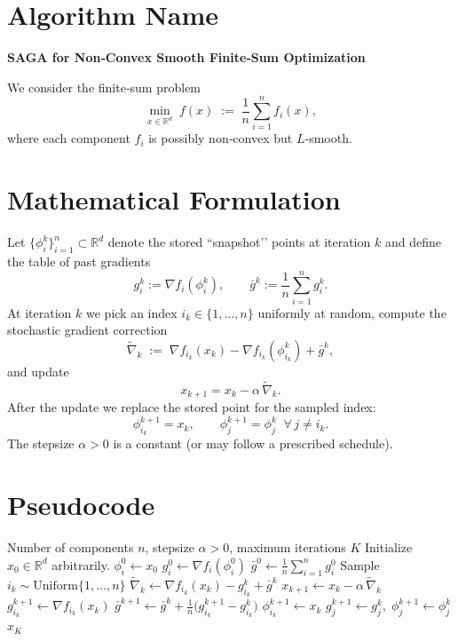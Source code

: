 \documentclass{article}
\newcommand{\R}{\mathbb{R}}
\begin{document}
\section*{Algorithm Name}
\textbf{SAGA for Non‑Convex Smooth Finite‑Sum Optimization}  

We consider the finite‑sum problem  
\[
\min_{x\in\R^{d}} \; f(x)\;:=\;\frac{1}{n}\sum_{i=1}^{n} f_i(x),
\]
where each component $f_i$ is possibly non‑convex but $L$‑smooth.

\section*{Mathematical Formulation}
Let $\{\phi_i^{k}\}_{i=1}^{n}\subset\R^{d}$ denote the stored “snapshot’’ points at iteration $k$
and define the table of past gradients
\[
g_i^{k}:=\nabla f_i(\phi_i^{k}),\qquad 
\bar g^{k}:=\frac{1}{n}\sum_{i=1}^{n} g_i^{k}.
\]
At iteration $k$ we pick an index $i_k\in\{1,\dots,n\}$ uniformly at random,
compute the stochastic gradient correction
\[
\widetilde{\nabla}_k \;:=\; \nabla f_{i_k}(x_k)-\nabla f_{i_k}(\phi_{i_k}^{k})+\bar g^{k},
\]
and update
\[
x_{k+1}=x_{k}-\alpha\,\widetilde{\nabla}_k . \tag{1}
\]
After the update we replace the stored point for the sampled index:
\[
\phi_{i_k}^{k+1}=x_k,\qquad 
\phi_{j}^{k+1}=\phi_{j}^{k}\;\; \forall\,j\neq i_k . \tag{2}
\]
The stepsize $\alpha>0$ is a constant (or may follow a prescribed schedule).

\section*{Pseudocode}
\begin{algorithm}[H]
\caption{SAGA (non‑convex)}\label{alg:saga}
\begin{algorithmic}[1]
\Require Number of components $n$, stepsize $\alpha>0$, maximum iterations $K$
\State Initialize $x_0\in\R^{d}$ arbitrarily.
    \State $\phi_i^{0}\gets x_0$   
    \State $g_i^{0}\gets\nabla f_i(\phi_i^{0})$
\EndFor
\State $\bar g^{0}\gets \frac{1}{n}\sum_{i=1}^{n} g_i^{0}$
    \State Sample $i_k\sim\text{Uniform}\{1,\dots,n\}$
    \State $\widetilde{\nabla}_k\gets \nabla f_{i_k}(x_k)-g_{i_k}^{k}+\bar g^{k}$
    \State $x_{k+1}\gets x_k-\alpha\,\widetilde{\nabla}_k$ 
    \State $g_{i_k}^{k+1}\gets \nabla f_{i_k}(x_k)$
    \State $\bar g^{k+1}\gets \bar g^{k}+ \frac{1}{n}\bigl(g_{i_k}^{k+1}-g_{i_k}^{k}\bigr)$
    \State $\phi_{i_k}^{k+1}\gets x_k$ 
        \State $g_{j}^{k+1}\gets g_{j}^{k},\;\phi_{j}^{k+1}\gets\phi_{j}^{k}$
    \EndFor
\EndFor
\State \Return $x_K$
\end{algorithmic}
\end{algorithm}
\end{document}
